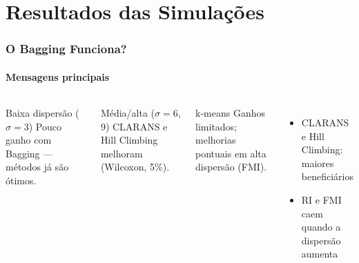 \documentclass[brazilian,11pt]{beamer}
\begin{document}
\section[Resultados]{Resultados das Simulações}

\begin{frame}[shrink=8]
    \frametitle{O Bagging Funciona?}
    \framesubtitle{Mensagens principais}

    \begin{columns}[T]
        \begin{block}{Baixa dispersão ($\sigma = 3$)}
            \small Pouco ganho com Bagging --- métodos já são ótimos.
        \end{block}
        \begin{block}{Média/alta ($\sigma = 6$, $9$)}
            \small CLARANS e Hill Climbing melhoram (Wilcoxon, 5\%).
        \end{block}
        \begin{alertblock}{k-means}
            \small Ganhos limitados; melhorias pontuais em alta dispersão (FMI).
        \end{alertblock}
        \begin{itemize}
            \item \small CLARANS e Hill Climbing: maiores beneficiários
            \item \small RI e FMI caem quando a dispersão aumenta
        \end{itemize}
    \end{columns}
\end{frame}
\end{document}
